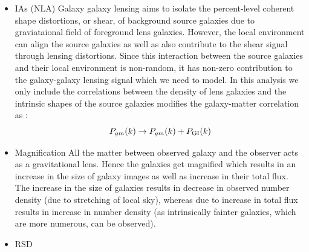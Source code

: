 \documentclass[fleqn,usenatbib]{mnras}
\begin{document}
\begin{itemize}
    \item IAs (NLA)
    Galaxy galaxy lensing aims to isolate the percent-level coherent shape distortions, or shear, of background source galaxies due to graviataional field of foreground lens galaxies. However, the local environment can align the source galaxies as well as also contribute to the shear signal through lensing distortions. Since this interaction between the source galaxies and their local environment is non-random, it has non-zero contribution to the galaxy-galaxy lensing signal which we need to model. In this analysis we only include the correlations between the density of lens galaxies and the intrinsic shapes of the source galaxies modifies the galaxy-matter correlation as :
    \begin{equation}
        P_{gm}(k) \rightarrow P_{gm}(k)  + P_{\rm GI}(k)
    \end{equation}
    \item Magnification
    All the matter between observed galaxy and the observer acts as a gravitational lens. Hence the galaxies get magnified which results in an increase in the size of galaxy images as well as increase in their total flux. The increase in the size of galaxies results in decrease in observed number density (due to stretching of local sky), whereas due to increase in total flux results in increase in number density (as intrinsically fainter galaxies, which are more numerous, can be observed).  
    \item RSD
    

\end{itemize}
\end{document}
